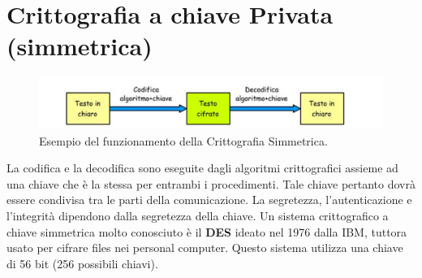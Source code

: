 \section{Crittografia a chiave Privata (simmetrica)}

\begin{figure}[H]
    \centering
    \includegraphics[width=\textwidth, keepaspectratio]{capitoli/crittografia/imgs/privata.png}
    \caption{Esempio del funzionamento della Crittografia Simmetrica.}
\end{figure}

La codifica e la decodifica sono eseguite dagli algoritmi crittografici assieme
ad una chiave che è la
stessa per entrambi i procedimenti. Tale chiave pertanto dovrà essere condivisa
tra le parti della
comunicazione. La segretezza, l'autenticazione e l'integrità dipendono dalla
segretezza della chiave.
Un sistema crittografico a chiave simmetrica molto conosciuto è il
\textbf{DES} ideato nel 1976 dalla IBM,
tuttora usato per cifrare files nei personal computer.
Questo sistema utilizza una chiave di 56 bit
(256 possibili chiavi).